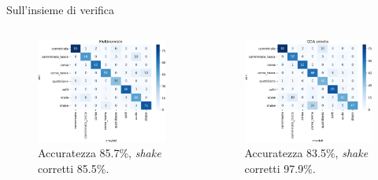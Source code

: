 \documentclass{beamer}
\begin{document}
\begin{frame}{Sull'insieme di verifica}
\begin{columns}[T] %
\begin{column}{.5\textwidth}
\begin{figure}[H]
\includegraphics[width=\textwidth]{../figure/confusionMatrix-Mn-test.png}
\caption{Accuratezza 85.7\%, {\em shake} corretti 85.5\%.}
\end{figure}
\end{column}%
\hfill%
\begin{column}{.5\textwidth}
\begin{figure}[H]
\includegraphics[width=\textwidth]{../figure/confusionMatrix-QDA-penalizzata-test.png}
\caption{Accuratezza 83.5\%, {\em shake} corretti 97.9\%.}
\end{figure}
\end{column}%
\end{columns}
\end{frame}
\end{document}

